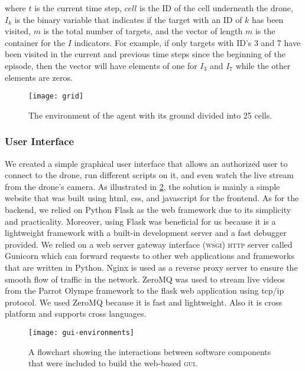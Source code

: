 \documentclass[../main.tex]{subfiles}
\begin{document}
\noindent 
where $t$ is the current time step, $cell$ is the ID of the
cell underneath the drone, $I_k$ is the binary variable 
that indicates if the target with an ID of $k$ has been
visited, $m$ is the total number of targets,
and the vector of length $m$ is the container for the
$I$ indicators. 
For example,
if only targets with ID's 3 and 7 have been visited
in the current and previous time steps since the beginning of the 
episode,
then the vector will have elements of one for $I_3$ and $I_7$ while
the other elements are zeros.

\begin{figure}[tbp]
	\centering
	\texttt{[image: grid]}
	\caption{The environment of the agent with its ground
		divided into 25 cells.}
	\label{fig:grid}
\end{figure}

\subsubsection{User Interface}

We created a simple graphical user interface that allows an authorized user 
to connect to the drone, run different scripts on it, and even watch the live 
stream from the drone's camera. 
As illustrated in \cref{fig:gui-environments}, the solution is mainly a simple 
website that was built using html, css, and javascript for the frontend. As 
for the backend, we relied on Python Flask as the web framework due to 
its simplicity and practicality. Moreover, using Flask was beneficial for us 
because it is a lightweight framework with a built-in development server and a 
fast debugger provided. 
We relied on a web server gateway interface (\textsc{wsgi}) \textsc{http} 
server called Gunicorn which can forward requests to other web applications 
and frameworks that are written in Python.
Nginx is used as a reverse proxy server to ensure the smooth flow 
of traffic in the network. ZeroMQ was used to stream live videos from the 
Parrot Olympe framework to the flask web application using tcp/ip protocol. 
We used ZeroMQ because it is fast and lightweight. Also it is cross platform
and supports cross languages.

\begin{figure}[tbp] 
	\centering
	\texttt{[image: gui-environments]} 
        \caption{A flowchart showing the interactions between software
        components that were included to build the web-based
        \textsc{gui}.}
	\label{fig:gui-environments}  
\end{figure}
\end{document}
